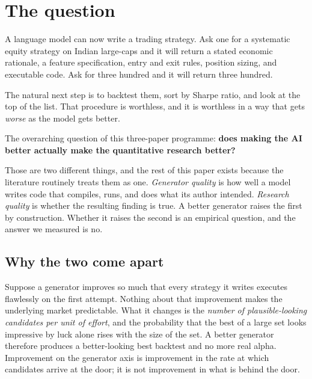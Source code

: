 \documentclass[11pt,a4paper]{article}
\begin{document}
\vspace{0.6em}
\trilogymap

\clearpage
{\hypersetup{linkcolor=navy}\tableofcontents}
\clearpage

\section{The question}
\label{sec:question}

A language model can now write a trading strategy. Ask one for a systematic equity strategy on
Indian large-caps and it will return a stated economic rationale, a feature specification, entry
and exit rules, position sizing, and executable code. Ask for three hundred and it will return
three hundred.

The natural next step is to backtest them, sort by Sharpe ratio, and look at the top of the list.
That procedure is worthless, and it is worthless in a way that gets \emph{worse} as the model
gets better.

\begin{finding}
The overarching question of this three-paper programme:
\textbf{does making the AI better actually make the quantitative research better?}
\smallskip

Those are two different things, and the rest of this paper exists because the literature
routinely treats them as one. \emph{Generator quality} is how well a model writes code that
compiles, runs, and does what its author intended. \emph{Research quality} is whether the
resulting finding is true. A better generator raises the first by construction. Whether it raises
the second is an empirical question, and the answer we measured is no.
\end{finding}

\subsection{Why the two come apart}

Suppose a generator improves so much that every strategy it writes executes flawlessly on the
first attempt. Nothing about that improvement makes the underlying market predictable. What it
changes is the \emph{number of plausible-looking candidates per unit of effort}, and the
probability that the best of a large set looks impressive by luck alone rises with the size of
the set. A better generator therefore produces a better-looking best backtest and no more real
alpha. Improvement on the generator axis is improvement in the rate at which candidates arrive at
the door; it is not improvement in what is behind the door.
\end{document}
